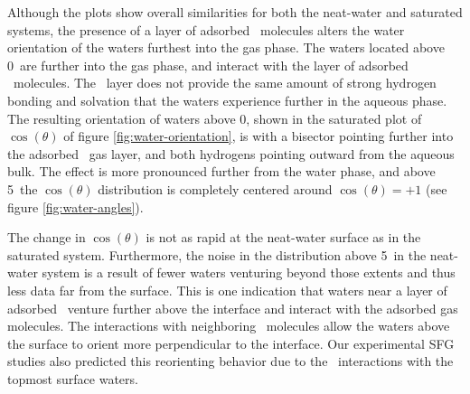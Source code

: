 Although the plots show overall similarities for both the neat-water and saturated systems, the presence of a layer of adsorbed \suldiox~molecules alters the water orientation of the waters furthest into the gas phase. The waters located above 0\angs~are further into the gas phase, and interact with the layer of adsorbed \suldiox~molecules. The \suldiox~layer does not provide the same amount of strong hydrogen bonding and solvation that the waters experience further in the aqueous phase. The resulting orientation of waters above 0\angs, shown in the saturated plot of $\cos(\theta)$ of figure \ref{fig:water-orientation}, is with a bisector pointing further into the adsorbed \suldiox~gas layer, and both hydrogens pointing outward from the aqueous bulk. The effect is more pronounced further from the water phase, and above 5\angs~the $\cos(\theta)$ distribution is completely centered around $\cos(\theta)=+1$ (see figure \ref{fig:water-angles}).


The change in $\cos(\theta)$ is not as rapid at the neat-water surface as in the saturated system. Furthermore, the noise in the distribution above 5\angs~in the neat-water system is a result of fewer waters venturing beyond those extents and thus less data far from the surface. This is one indication that waters near a layer of adsorbed \suldiox~venture further above the interface and interact with the adsorbed gas molecules. The interactions with neighboring \suldiox~molecules allow the waters above the surface to orient more perpendicular to the interface. Our experimental SFG studies also predicted this reorienting behavior due to the \suldiox~interactions with the topmost surface waters.\cite{Ota2011}

